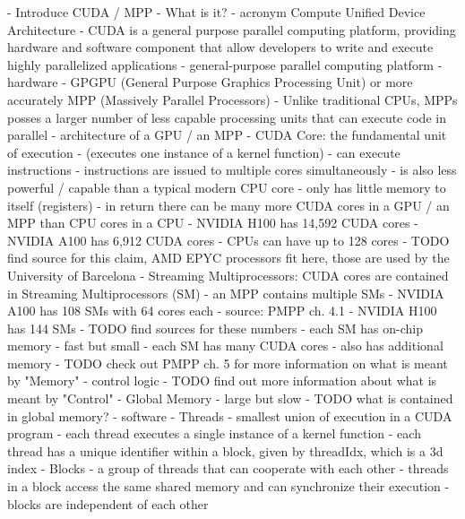 - Introduce CUDA / MPP
  - What is it?
    - acronym Compute Unified Device Architecture
    - CUDA is a general purpose parallel computing platform, providing hardware and software component that allow developers to write and execute highly parallelized applications
    - general-purpose parallel computing platform
      - hardware
        - GPGPU (General Purpose Graphics Processing Unit) or more accurately MPP (Massively Parallel Processors)
        - Unlike traditional CPUs, MPPs posses a larger number of less capable processing units that can execute code in parallel
        - architecture of a GPU / an MPP
          - CUDA Core: the fundamental unit of execution
            - (executes one instance of a kernel function)
            - can execute instructions
              - instructions are issued to multiple cores simultaneously
            - is also less powerful / capable than a typical modern CPU core
            - only has little memory to itself (registers)
            - in return there can be many more CUDA cores in a GPU / an MPP than CPU cores in a CPU
            - NVIDIA H100 has 14,592 CUDA cores
            - NVIDIA A100 has 6,912 CUDA cores
            - CPUs can have up to 128 cores
              - TODO find source for this claim, AMD EPYC processors fit here, those are used by the University of Barcelona
          - Streaming Multiprocessors: CUDA cores are contained in Streaming Multiprocessors (SM)
            - an MPP contains multiple SMs
              - NVIDIA A100 has 108 SMs with 64 cores each
                - source: PMPP ch. 4.1
              - NVIDIA H100 has 144 SMs
              - TODO find sources for these numbers
            - each SM has on-chip memory
              - fast but small
            - each SM has many CUDA cores
            - also has additional memory
              - TODO check out PMPP ch. 5 for more information on what is meant by "Memory"
            - control logic
              - TODO find out more information about what is meant by "Control"
          - Global Memory
            - large but slow
            - TODO what is contained in global memory?
      - software
        - Threads
          - smallest union of execution in a CUDA program
          - each thread executes a single instance of a kernel function
          - each thread has a unique identifier within a block, given by threadIdx, which is a 3d index
        - Blocks
          - a group of threads that can cooperate with each other
          - threads in a block access the same shared memory and can synchronize their execution
          - blocks are independent of each other
